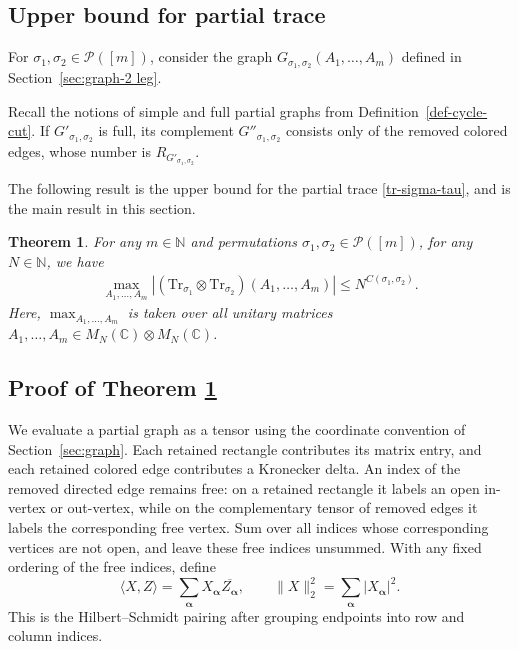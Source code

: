 \documentclass[12pt]{article}
\numberwithin{equation}{section}
\theoremstyle{plain}
\newtheorem{theorem}{Theorem}[section]
\def\bN{\mathbb N}
\def\bC{\mathbb C}
\def\cP{\mathcal P}
\def\Tr{\mathrm {Tr}}
\begin{document}
\subsection{Upper bound for partial trace}

For $\sigma_1,\sigma_2\in\cP([m])$, consider the graph $G_{\sigma_1,\sigma_2}(A_1,\ldots,A_m)$ defined in Section~\ref{sec:graph-2 leg}.

Recall the notions of simple and full partial graphs from Definition~\ref{def-cycle-cut}. If $G'_{\sigma_1,\sigma_2}$ is full, its complement $G''_{\sigma_1,\sigma_2}$ consists only of the removed colored edges, whose number is $R_{G'_{\sigma_1,\sigma_2}}$.

The following result is the upper bound for the partial trace \eqref{tr-sigma-tau}, and is the main result in this section.

\begin{theorem} \label{Thm-upper}
For any $m\in\bN$ and permutations $\sigma_1,\sigma_2 \in \cP([m])$, for any $N \in \bN$, we have
\begin{align*}
    \max_{A_1,\ldots,A_m} \left| \left( \Tr_{\sigma_1} \otimes \Tr_{\sigma_2} \right) \left( A_1, \ldots, A_m \right) \right|
    \le N^{C(\sigma_1,\sigma_2)}.
\end{align*}
Here, $\max_{A_1,\ldots,A_m}$ is taken over all unitary matrices $A_1,\ldots,A_m \in M_N (\bC) \otimes M_N(\bC)$.
\end{theorem}

\subsection{Proof of Theorem \ref{Thm-upper}}

We evaluate a partial graph as a tensor using the coordinate convention of Section~\ref{sec:graph}. Each retained rectangle contributes its matrix entry, and each retained colored edge contributes a Kronecker delta. An index of the removed directed edge remains free: on a retained rectangle it labels an open in-vertex or out-vertex, while on the complementary tensor of removed edges it labels the corresponding free vertex. Sum over all indices whose corresponding vertices are not open, and leave these free indices unsummed. With any fixed ordering of the free indices, define
\[
\langle X,Z\rangle=\sum_{\boldsymbol\alpha}X_{\boldsymbol\alpha}\overline{Z_{\boldsymbol\alpha}},
\qquad \|X\|_2^2=\sum_{\boldsymbol\alpha}|X_{\boldsymbol\alpha}|^2.
\]
This is the Hilbert--Schmidt pairing after grouping endpoints into row and column indices.
\end{document}
